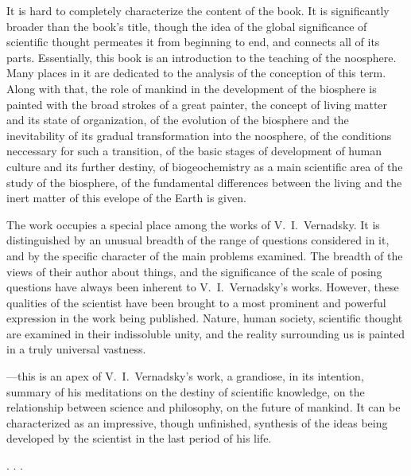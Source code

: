 It is hard to completely characterize the content of the book.  It is
significantly broader than the book's title, though the idea of the global
significance of scientific thought permeates it from beginning to end, and
connects all of its parts.  Essentially, this book is an introduction to the
teaching of the noosphere.  Many places in it are dedicated to the analysis of
the conception of this term.  Along with that, the role of mankind in the
development of the biosphere is painted with the broad strokes of a great
painter, the concept of living matter and its state of organization, of the
evolution of the biosphere and the inevitability of its gradual transformation
into the noosphere, of the conditions neccessary for such a transition, of the
basic stages of development of human culture and its further destiny, of
biogeochemistry as a main scientific area of the study of the biosphere, of the
fundamental differences between the living and the inert matter of this evelope
of the Earth is given.

The work  occupies a
special place among the works of V.~I.\ Vernadsky.  It is distinguished by an
unusual breadth of the range of questions considered in it, and by the specific
character of the main problems examined.  The breadth of the views of their
author about things, and the significance of the scale of posing questions have
always been inherent to V.~I.\ Vernadsky's works.  However, these qualities of
the scientist have been brought to a most prominent and powerful expression in
the work being published.  Nature, human society, scientific thought are
examined in their indissoluble unity, and the reality surrounding us is painted
in a truly universal vastness.

---this is an apex of V.~I.\ 
Vernadsky's work, a grandiose, in its intention, summary of his meditations on
the destiny of scientific knowledge, on the relationship between science and
philosophy, on the future of mankind.  It can be characterized as an
impressive, though unfinished, synthesis of the ideas being developed by the
scientist in the last period of his life.

. . .
